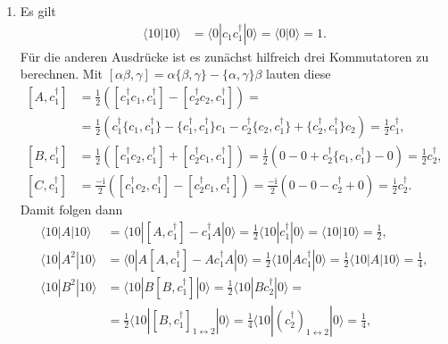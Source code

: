 \documentclass[german, parskip=full]{scrartcl}
\newcommand{\brak}{}
\newcommand{\braket}{}
\newcommand{\kla}{}
\newcommand{\klam}{}
\newcommand{\I}{\text{i}}
\begin{document}
\begin{enumerate}
\item[d)] Es gilt
\begin{align}
\brak\langle {10}| {10}\rangle&=\braket\langle {0} | {c_1c_1^\dagger} | {0}\rangle=\brak\langle {0}| {0}\rangle=1.
\end{align}
Für die anderen Ausdrücke ist es zunächst hilfreich drei Kommutatoren zu berechnen. 
Mit $\klam\left[ {\alpha\beta,\gamma} \right]=\alpha\{\beta,\gamma\}-\{\alpha,\gamma\}\beta$ lauten diese
\begin{align*}
\klam\left[ {A,c_1^\dagger} \right]&=\frac{1}{2}\kla\left( {\klam\left[ {c_1^\dagger c_1,c_1^\dagger} \right]-\klam\left[ {c_2^\dagger c_2,c_1^\dagger} \right]} \right)=\\
&=\frac{1}{2}\kla\left( {c_1^\dagger\{c_1,c_1^\dagger\}-\{c_1^\dagger,c_1^\dagger\}c_1-c_2^\dagger\{c_2,c_1^\dagger\}+\{c_2^\dagger,c_1^\dagger\}c_2} \right)=\frac{1}{2}c_1^\dagger,\\
\klam\left[ {B,c_1^\dagger} \right]&=\frac{1}{2}\kla\left( {\klam\left[ {c_1^\dagger c_2,c_1^\dagger} \right]+\klam\left[ {c_2^\dagger c_1,c_1^\dagger} \right]} \right)=\frac{1}{2}\kla\left( {0-0+c_2^\dagger\{c_1,c_1^\dagger\}-0} \right)=\frac{1}{2}c_2^\dagger,\\
\klam\left[ {C,c_1^\dagger} \right]&=\frac{-\I}{2}\kla\left( {\klam\left[ {c_1^\dagger c_2,c_1^\dagger} \right]-\klam\left[ {c_2^\dagger c_1,c_1^\dagger} \right]} \right)=\frac{-\I}{2}\kla\left( {0-0-c_2^\dagger +0} \right)=\frac{\I}{2}c_2^\dagger.
\end{align*}
Damit folgen dann
\begin{align*}
\braket\langle {10} | {A} | {10}\rangle&=\braket\langle {10} | {\klam\left[ {A,c_1^\dagger} \right]-c_1^\dagger A} | {0}\rangle=\frac{1}{2}\braket\langle {10} | {c_1^\dagger} | {0}\rangle=\brak\langle {10}| {10}\rangle=\frac{1}{2},\\
\braket\langle {10} | {A^2} | {10}\rangle&=\braket\langle {0} | {A\klam\left[ {A,c_1^\dagger} \right]-Ac_1^\dagger A} | {0}\rangle=\frac{1}{2}\braket\langle {10} | {A c_1^\dagger} | {0}\rangle=\frac{1}{2}\braket\langle {10} | {A} | {10}\rangle=\frac{1}{4},\\
\braket\langle {10} | {B^2} | {10}\rangle&=\braket\langle {10} | {B\klam\left[ {B,c_1^\dagger} \right]} | {0}\rangle=\frac{1}{2}\braket\langle {10} | {Bc_2^\dagger} | {0}\rangle=\\
&=\frac{1}{2}\braket\langle {10} | {\klam\left[ {B,c_1^\dagger} \right]_{1\leftrightarrow 2}} | {0}\rangle=\frac{1}{4}\braket\langle {10} | {(c_2^\dagger)_{1\leftrightarrow 2}} | {0}\rangle=\frac{1}{4},\\

\end{align*}
\end{enumerate}
\end{document}
